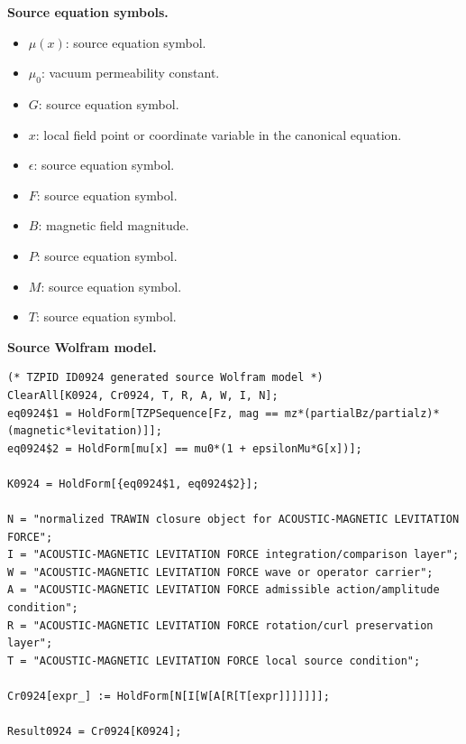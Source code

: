 \begin{minipage}[t]{0.49\linewidth}
\begingroup
\small
\raggedright
\textbf{Source equation symbols.}\par
\begin{itemize}[leftmargin=1.35em,itemsep=1pt,topsep=1pt,parsep=0pt]
    \item $\mu(x)$: source equation symbol.
    \item $\mu_0$: vacuum permeability constant.
    \item $G$: source equation symbol.
    \item $x$: local field point or coordinate variable in the canonical equation.
    \item $\epsilon$: source equation symbol.
    \item $F$: source equation symbol.
    \item $B$: magnetic field magnitude.
    \item $P$: source equation symbol.
    \item $M$: source equation symbol.
    \item $T$: source equation symbol.
\end{itemize}
\endgroup
\end{minipage}\hfill
\begin{minipage}[t]{0.47\linewidth}
\begingroup
\scriptsize
\raggedright
\textbf{Source Wolfram model.}\par
\begin{Verbatim}[fontsize=\tiny,breaklines=true,breakanywhere=true]
(* TZPID ID0924 generated source Wolfram model *)
ClearAll[K0924, Cr0924, T, R, A, W, I, N];
eq0924$1 = HoldForm[TZPSequence[Fz, mag == mz*(partialBz/partialz)*(magnetic*levitation)]];
eq0924$2 = HoldForm[mu[x] == mu0*(1 + epsilonMu*G[x])];

K0924 = HoldForm[{eq0924$1, eq0924$2}];

N = "normalized TRAWIN closure object for ACOUSTIC-MAGNETIC LEVITATION FORCE";
I = "ACOUSTIC-MAGNETIC LEVITATION FORCE integration/comparison layer";
W = "ACOUSTIC-MAGNETIC LEVITATION FORCE wave or operator carrier";
A = "ACOUSTIC-MAGNETIC LEVITATION FORCE admissible action/amplitude condition";
R = "ACOUSTIC-MAGNETIC LEVITATION FORCE rotation/curl preservation layer";
T = "ACOUSTIC-MAGNETIC LEVITATION FORCE local source condition";

Cr0924[expr_] := HoldForm[N[I[W[A[R[T[expr]]]]]]];

Result0924 = Cr0924[K0924];
\end{Verbatim}
\endgroup
\end{minipage}

